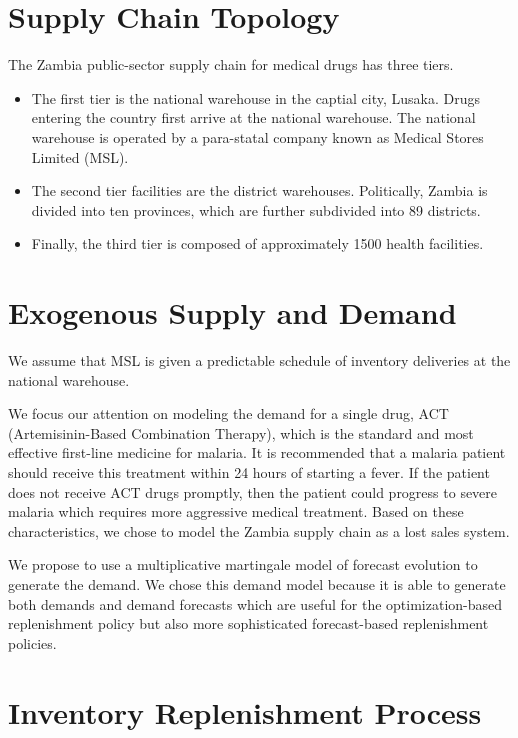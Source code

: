 \section{Supply Chain Topology}

The Zambia public-sector supply chain for medical drugs has three tiers.
\begin{itemize}
\item
The first tier is the national warehouse in the captial city, Lusaka.
Drugs entering the country first arrive at the national warehouse.
The national warehouse is operated by a para-statal company
known as Medical Stores Limited (MSL).
\item
The second tier facilities are the district warehouses.
Politically, Zambia is divided into ten provinces,
which are further subdivided into 89 districts.
\item
Finally, the third tier is composed of approximately 1500 health facilities.
\end{itemize}




\section{Exogenous Supply and Demand}

We assume that MSL is given a predictable schedule
of inventory deliveries at the national warehouse.

We focus our attention on modeling the demand for a single drug,
ACT (Artemisinin-Based Combination Therapy),
which is the standard and most effective first-line medicine for malaria.
It is recommended that a malaria patient
should receive this treatment within 24 hours of starting a fever.
If the patient does not receive ACT drugs promptly,
then the patient could progress to severe malaria
which requires more aggressive medical treatment.
Based on these characteristics,
we chose to model the Zambia supply chain as a lost sales system.

We propose to use a multiplicative
martingale model of forecast evolution
\citep{heath-jackson-1994}
to generate the demand.
We chose this demand model
because it is able to generate both demands
and demand forecasts
which are useful for the optimization-based replenishment policy
but also more sophisticated forecast-based replenishment policies.





\section{Inventory Replenishment Process}

